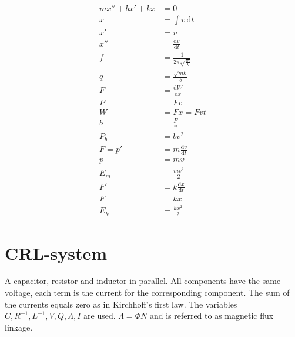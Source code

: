 \documentclass[]{../common/elementary-physics}
\begin{document}
\begin{align}
m x'' + b x' + k x &= 0 \\
x &= \int v \, \mathrm{d}t \\
x' &= v \tag{definition of velocity} \\
x'' &= \frac{\mathrm{d}v}{\mathrm{d}t} \tag{definition of acceleration} \\
f &= \frac{1}{2 \pi \sqrt{\frac{m}{k}}} \tag{frequency} \\
q &= \frac{\sqrt{m k}}{b} \tag{quality factor}\\
F &= \frac{\mathrm{d}W}{\mathrm{d}x} \\
P &= F v \tag{power} \\
W &= F x = F v t \tag{work} \\
b &= \frac{F}{v} \tag{parasite} \\
P_b &= b v^2 \tag{losses} \\
F = p' &= m \frac{\mathrm{d}v}{\mathrm{d}t} \tag{Newton's 2nd law} \\
p &= m v \tag{definition of momentum} \\
E_m &= \frac{m v^2}{2} \tag{kinetic energy} \\
F' &= k \frac{\mathrm{d}x}{\mathrm{d}t} \\
F &= k x \tag{Hooke's law} \\
E_k &= \frac{k x^2}{2} \tag{energy in a spring} 
\end{align}

\pagebreak

\section{CRL-system}

A capacitor, resistor and inductor in parallel.
All components have the same voltage, each term is the current for the corresponding component.
The sum of the currents equals zero as in Kirchhoff's first law.
The variables $C,R^{-1},L^{-1},V,Q,\Lambda,I$ are used.
$\Lambda = \Phi N$ and is referred to as magnetic flux linkage.
\end{document}
